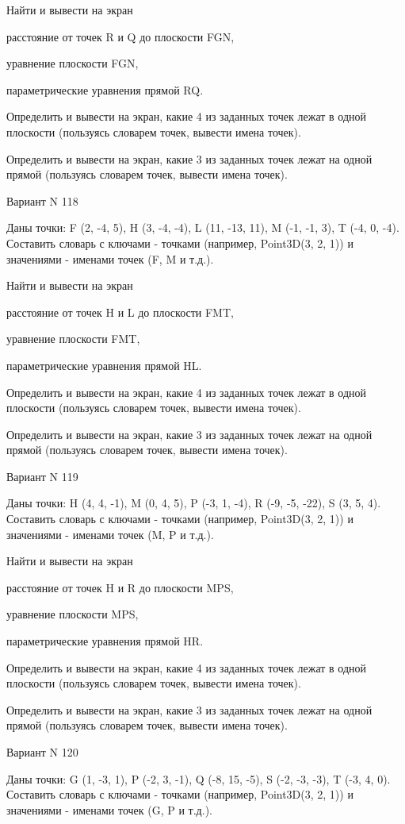 \documentclass[11pt]{report}
\begin{document}
Найти и вывести на экран


расстояние от точек R и Q до плоскости FGN,


уравнение плоскости FGN,


параметрические уравнения прямой RQ.


Определить и вывести на экран, какие 4 из заданных точек лежат в одной плоскости (пользуясь словарем точек, вывести имена точек).


Определить и вывести на экран, какие 3 из заданных точек лежат на одной прямой (пользуясь словарем точек, вывести имена точек).

\newpage
Вариант N 118

Даны точки: F (2, -4, 5), H (3, -4, -4), L (11, -13, 11), M (-1, -1, 3), T (-4, 0, -4).
Составить словарь с ключами - точками (например, Point3D(3, 2, 1)) и значениями - именами точек (F, M и т.д.).


Найти и вывести на экран


расстояние от точек H и L до плоскости FMT,


уравнение плоскости FMT,


параметрические уравнения прямой HL.


Определить и вывести на экран, какие 4 из заданных точек лежат в одной плоскости (пользуясь словарем точек, вывести имена точек).


Определить и вывести на экран, какие 3 из заданных точек лежат на одной прямой (пользуясь словарем точек, вывести имена точек).

\newpage
Вариант N 119

Даны точки: H (4, 4, -1), M (0, 4, 5), P (-3, 1, -4), R (-9, -5, -22), S (3, 5, 4).
Составить словарь с ключами - точками (например, Point3D(3, 2, 1)) и значениями - именами точек (M, P и т.д.).


Найти и вывести на экран


расстояние от точек H и R до плоскости MPS,


уравнение плоскости MPS,


параметрические уравнения прямой HR.


Определить и вывести на экран, какие 4 из заданных точек лежат в одной плоскости (пользуясь словарем точек, вывести имена точек).


Определить и вывести на экран, какие 3 из заданных точек лежат на одной прямой (пользуясь словарем точек, вывести имена точек).

\newpage
Вариант N 120

Даны точки: G (1, -3, 1), P (-2, 3, -1), Q (-8, 15, -5), S (-2, -3, -3), T (-3, 4, 0).
Составить словарь с ключами - точками (например, Point3D(3, 2, 1)) и значениями - именами точек (G, P и т.д.).
\end{document}
